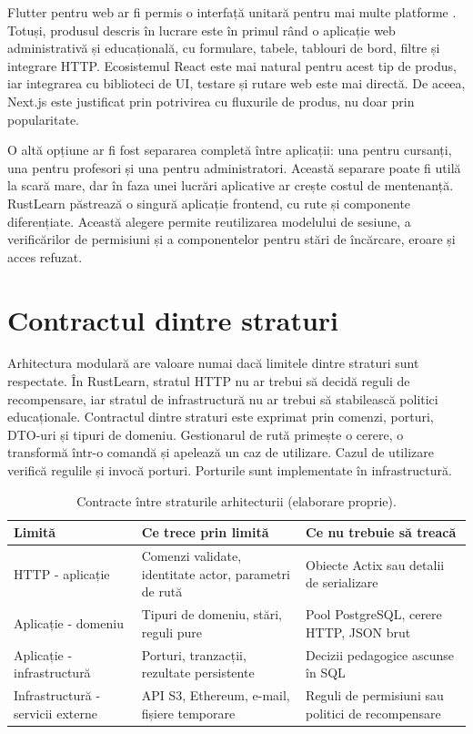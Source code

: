Flutter pentru web ar fi permis o interfață unitară pentru mai multe platforme \cite{flutterDev}. Totuși, produsul descris în lucrare este în primul rând o aplicație web administrativă și educațională, cu formulare, tabele, tablouri de bord, filtre și integrare HTTP. Ecosistemul React este mai natural pentru acest tip de produs, iar integrarea cu biblioteci de UI, testare și rutare web este mai directă. De aceea, Next.js este justificat prin potrivirea cu fluxurile de produs, nu doar prin popularitate.

O altă opțiune ar fi fost separarea completă între aplicații: una pentru cursanți, una pentru profesori și una pentru administratori. Această separare poate fi utilă la scară mare, dar în faza unei lucrări aplicative ar crește costul de mentenanță. RustLearn păstrează o singură aplicație frontend, cu rute și componente diferențiate. Această alegere permite reutilizarea modelului de sesiune, a verificărilor de permisiuni și a componentelor pentru stări de încărcare, eroare și acces refuzat.

\section{Contractul dintre straturi}
Arhitectura modulară are valoare numai dacă limitele dintre straturi sunt respectate. În RustLearn, stratul HTTP nu ar trebui să decidă reguli de recompensare, iar stratul de infrastructură nu ar trebui să stabilească politici educaționale. Contractul dintre straturi este exprimat prin comenzi, porturi, DTO-uri și tipuri de domeniu. Gestionarul de rută primește o cerere, o transformă într-o comandă și apelează un caz de utilizare. Cazul de utilizare verifică regulile și invocă porturi. Porturile sunt implementate în infrastructură.

\begin{table}[H]
    \centering
    \caption{Contracte între straturile arhitecturii (elaborare proprie).}
    \label{tab:contracte_straturi}
    \begin{tabular}{P{3cm}P{5.2cm}P{5.4cm}}
        \toprule
        Limită & Ce trece prin limită & Ce nu trebuie să treacă \\
        \midrule
        HTTP - aplicație & Comenzi validate, identitate actor, parametri de rută & Obiecte Actix sau detalii de serializare \\
        Aplicație - domeniu & Tipuri de domeniu, stări, reguli pure & Pool PostgreSQL, cerere HTTP, JSON brut \\
        Aplicație - infrastructură & Porturi, tranzacții, rezultate persistente & Decizii pedagogice ascunse în SQL \\
        Infrastructură - servicii externe & API S3, Ethereum, e-mail, fișiere temporare & Reguli de permisiuni sau politici de recompensare \\
        \bottomrule
    \end{tabular}
\end{table}

